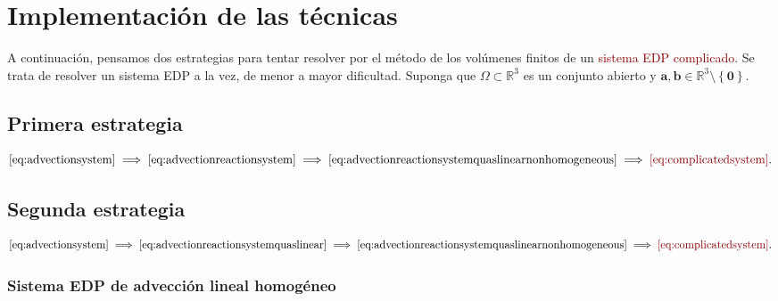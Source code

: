 \chapter{Implementación de las técnicas}

A continuación, pensamos dos estrategias para tentar resolver por el
método de los volúmenes finitos de un
\textcolor{DarkRed}{sistema EDP complicado}.
Se trata de resolver un sistema EDP a la vez, de menor a mayor
dificultad.
Suponga que $\Omega\subset\mathbb{R}^{3}$ es un conjunto abierto y
$\symbf{a},\symbf{b}\in\mathbb{R}^{3}\setminus\left\{\symbf{0}\right\}$.

\section{Primera estrategia}

\begin{equation*}
	\eqref{eq:advectionsystem}\implies
	\eqref{eq:advectionreactionsystem}\implies
	\eqref{eq:advectionreactionsystemquaslinearnonhomogeneous}\implies
	\mathcolor{DarkRed}{\eqref{eq:complicatedsystem}}.
\end{equation*}

\section{Segunda estrategia}

\begin{equation*}
	\eqref{eq:advectionsystem}\implies
	\eqref{eq:advectionreactionsystemquaslinear}\implies
	\eqref{eq:advectionreactionsystemquaslinearnonhomogeneous}\implies
	\mathcolor{DarkRed}{\eqref{eq:complicatedsystem}}.
\end{equation*}

\subsection*{Sistema EDP de advección lineal homogéneo}

